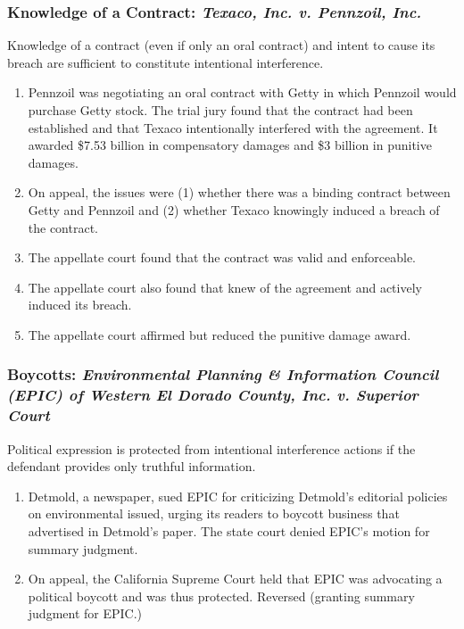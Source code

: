 \subsubsection{Knowledge of a Contract: \emph{Texaco, Inc. v. Pennzoil, Inc.}}

Knowledge of a contract (even if only an oral contract) and intent to cause 
its breach are sufficient to constitute intentional interference.

\begin{enumerate}
    \item Pennzoil was negotiating an oral contract with Getty in which Pennzoil 
    would purchase Getty stock. The trial jury found that the contract had 
    been established and that Texaco intentionally 
    interfered with the agreement. It awarded \$7.53 billion in compensatory 
    damages and \$3 billion in punitive damages.
    \item On appeal, the issues were (1) whether there was a binding contract 
    between Getty and Pennzoil and (2) whether Texaco knowingly induced a 
    breach of the contract.
    \item The appellate court found that the contract was valid and 
    enforceable.
    \item The appellate court also found that knew of the agreement and 
    actively induced its breach.
    \item The appellate court affirmed but reduced the punitive damage award.
\end{enumerate}

\subsubsection{Boycotts: \emph{Environmental Planning \& Information Council (EPIC) of Western 
El Dorado County, Inc. v. Superior Court}}

Political expression is protected from intentional interference actions if the 
defendant provides only truthful information.

\begin{enumerate}
    \item Detmold, a newspaper, sued EPIC for criticizing Detmold's editorial 
    policies on environmental issued, urging its readers to boycott business 
    that advertised in Detmold's paper. The state court denied EPIC's motion 
    for summary judgment.
    \item On appeal, the California Supreme Court held that EPIC was 
    advocating a political boycott and was thus protected. Reversed (granting 
    summary judgment for EPIC.)
\end{enumerate}

